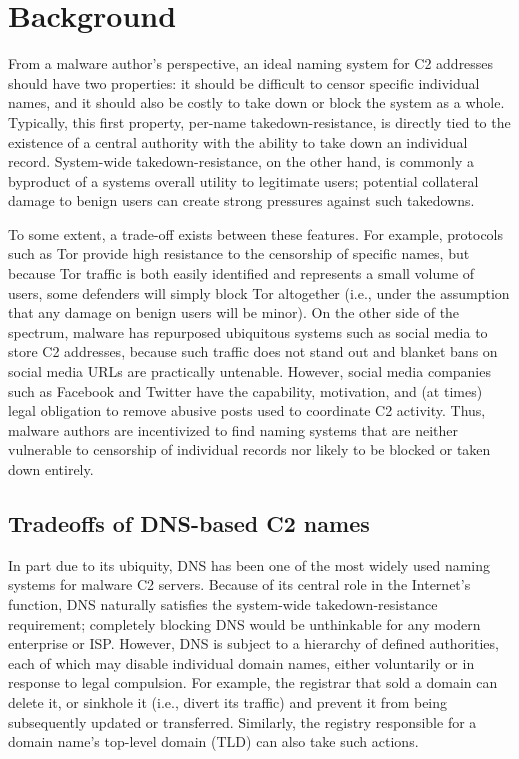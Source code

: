 \section{Background}
\label{sec:background}

From a malware author's perspective, an ideal naming system for C2
addresses should have two properties: it should be difficult to censor
specific individual names, and it should also be costly to take down
or block the system as a whole.  Typically, this first property,
per-name takedown-resistance, is directly tied to the existence of a
central authority with the ability to take down an individual record.
System-wide takedown-resistance, on the other hand, is commonly a
byproduct of a systems overall utility to legitimate users; potential
collateral damage to benign users can create strong pressures against
such takedowns.

To some extent, a trade-off exists between these features. For
example, protocols such as Tor provide high resistance to the
censorship of specific names, but because Tor traffic is both easily
identified and represents a small volume of users, some defenders will
simply block Tor altogether (i.e., under the assumption that any
damage on benign users will be minor).  On the other side of the
spectrum, malware has repurposed ubiquitous systems such as social
media to store C2 addresses, because such traffic does not stand out
and blanket bans on social media URLs are practically untenable.
However, social media companies such as Facebook and Twitter have the
capability, motivation, and (at times) legal obligation to remove
abusive posts used to coordinate C2 activity.  Thus, malware authors
are incentivized to find naming systems that are neither vulnerable to
censorship of individual records nor likely to be blocked or taken
down entirely.

\subsection{Tradeoffs of DNS-based C2 names}

In part due to its ubiquity, DNS has been one of the most widely used
naming systems for malware C2 servers.  Because of its central role in
the Internet's function, DNS naturally satisfies the system-wide
takedown-resistance requirement; completely blocking DNS would be
unthinkable for any modern enterprise or ISP.  However, DNS is subject
to a hierarchy of defined authorities, each of which may disable
individual domain names, either voluntarily or in response to legal
compulsion.  For example, the registrar that sold a domain can delete
it, or sinkhole it (i.e., divert its traffic) and prevent it from
being subsequently updated or transferred.  Similarly, the registry
responsible for a domain name's top-level domain (TLD) can also take
such actions.

